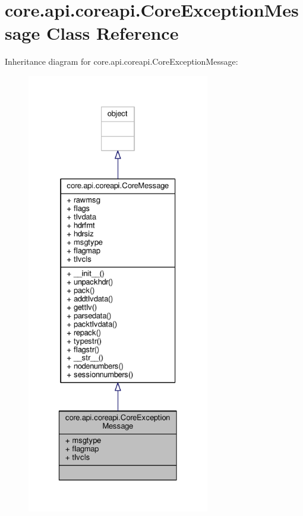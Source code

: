 \hypertarget{classcore_1_1api_1_1coreapi_1_1_core_exception_message}{\section{core.\+api.\+coreapi.\+Core\+Exception\+Message Class Reference}
\label{classcore_1_1api_1_1coreapi_1_1_core_exception_message}
}


Inheritance diagram for core.\+api.\+coreapi.\+Core\+Exception\+Message\+:
\nopagebreak
\begin{figure}[H]
\begin{center}
\leavevmode
\includegraphics[height=550pt]{classcore_1_1api_1_1coreapi_1_1_core_exception_message__inherit__graph}
\end{center}
\end{figure}


